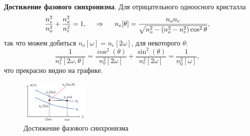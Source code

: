 \textbf{Достижение фазового синхронизма}. Для отрицательного одноосного кристалла
\begin{equation*}
    \frac{n_z^2}{n_o^2} + \frac{n_x^2}{n_e^2} =1,
    \hspace{0.5cm} \Rightarrow \hspace{0.5cm}
    n_e [\theta] = \frac{n_o n_e}{\sqrt{n_o^2 - (n_o^2-n_e^2) \cos^2 \theta}},
\end{equation*}
так что можем добиться $n_o [\omega] = n_e[2 \omega]$, для некоторого $\theta$:
\begin{equation*}
    \frac{1}{n_e^2[2 \omega, \theta]} = \frac{\cos^2 (\theta)}{n_o^2 [2 \omega]} + \frac{\sin^2(\theta)}{n_e^2 [2\omega]} = \frac{1}{n_0^2[\omega]},
\end{equation*}
что прекрасно видно на графике.
\begin{figure}[h]
    \centering
    \includegraphics[width=0.3\textwidth]{figures/3_1.png}
    \caption{Достижение фазового синхронизма}
\end{figure}
